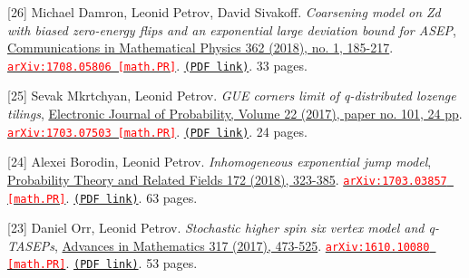 \begin{etaremune}
\item[{[26]}] 
Michael Damron, Leonid Petrov, David Sivakoff.
\emph{Coarsening model on Zd with biased zero-energy flips and an exponential large deviation bound for ASEP}, \href{https://doi.org/10.1007/s00220-018-3180-2}{Communications in Mathematical Physics 362 (2018), no. 1, 185-217}. 
\href{https://arxiv.org/abs/1708.05806}{\texttt{{\textcolor{red}{arXiv:1708.05806 [math.PR]}}}}. \href{https://storage.lpetrov.cc/papers/26-coarsening_model_on.pdf}{\texttt{(PDF link)}}. 33 pages.

















\item[{[25]}] 
Sevak Mkrtchyan, Leonid Petrov.
\emph{GUE corners limit of q-distributed lozenge tilings}, \href{http://dx.doi.org/10.1214/17-EJP112}{Electronic Journal of Probability, Volume 22 (2017), paper no. 101, 24 pp}. 
\href{https://arxiv.org/abs/1703.07503}{\texttt{{\textcolor{red}{arXiv:1703.07503 [math.PR]}}}}. \href{https://storage.lpetrov.cc/papers/25-gue_corners_limit.pdf}{\texttt{(PDF link)}}. 24 pages.



\item[{[24]}] 
Alexei Borodin, Leonid Petrov.
\emph{Inhomogeneous exponential jump model}, \href{https://doi.org/10.1007/s00440-017-0810-0}{Probability Theory and Related Fields 172 (2018), 323-385}. 
\href{https://arxiv.org/abs/1703.03857}{\texttt{{\textcolor{red}{arXiv:1703.03857 [math.PR]}}}}. \href{https://storage.lpetrov.cc/papers/24-inhomogeneous_exponential_jump.pdf}{\texttt{(PDF link)}}. 63 pages.

















\item[{[23]}] 
Daniel Orr, Leonid Petrov.
\emph{Stochastic higher spin six vertex model and q-TASEPs}, \href{https://doi.org/10.1016/j.aim.2017.07.003}{Advances in Mathematics 317 (2017), 473-525}. 
\href{https://arxiv.org/abs/1610.10080}{\texttt{{\textcolor{red}{arXiv:1610.10080 [math.PR]}}}}. \href{https://storage.lpetrov.cc/papers/23-stochastic_higher_spin.pdf}{\texttt{(PDF link)}}. 53 pages.










\end{etaremune}
